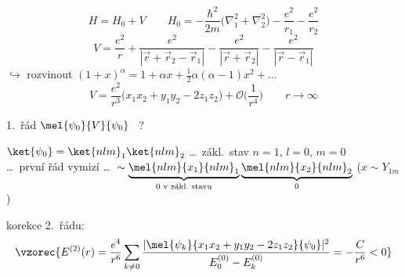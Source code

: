 \begin{priklad}
\begin{center}
\end{center}
\[
  H = H_0 + V \qquad H_0 = -\frac{\hbar^2}{2m}\big(\nabla_1^2 + \nabla_2^2\big) - \frac{e^2}{r_1} - \frac{e^2}{r_2}
\]
\[
  V = \frac{e^2}{r} + \frac{e^2}{|\vec r + \vec r_2 - \vec r_1|} - \frac{e^2}{|\vec r + \vec r_2|} - \frac{e^2}{|\vec r - \vec r_1|}
\]
\quad $\hookrightarrow$ rozvinout \quad $(1 + x)^\alpha = 1 + \alpha x + \frac12\alpha(\alpha - 1)x^2 + \dots$
\[
  V = \frac{e^2}{r^3}\big(x_1x_2 + y_1y_2 - 2z_1z_2\big) + \mathcal{O}\Big(\frac{1}{r^4}\Big) \qquad r\to\infty
\]

1.\ řád \quad $\mel{\psi_0}{V}{\psi_0}$ \ ?

$\ket{\psi_0} = \ket{nlm}_1\ket{nlm}_2$ \quad \dots\ zákl.\ stav $n = 1$, $l = 0$, $m = 0$ \\
\dots\ první řád vymizí \dots\ $\sim \underbrace{\mel{nlm}{x_1}{nlm}_1}_{0\text{ v zákl.\ stavu}}\underbrace{\mel{nlm}{x_2}{nlm}_2}_{0}$
\quad ($x\sim Y_{1m}$)

korekce 2.\ řádu:
\[
  \vzorec{E^{(2)}(r) = \frac{e^4}{r^6}\sum_{k\neq 0}\frac{|\mel{\psi_k}{x_1x_2 + y_1y_2 - 2z_1z_2}{\psi_0}|^2}{E_0^{(0)} - E_k^{(0)}} = -\frac{C}{r^6} < 0}
\]
\end{priklad}

